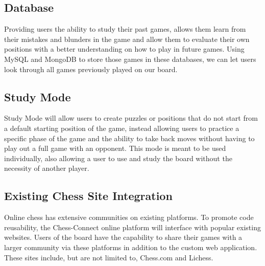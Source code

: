 \documentclass{article}
\begin{document}
\subsection{Database}
{Providing users the ability to study their past games, allows them learn from their mistakes and blunders in the game and allow them to evaluate their own positions with a better understanding on how to play in future games. 
Using MySQL and MongoDB to store those games in these databases, we can let users look through all games previously played on our board.}

\subsection{Study Mode}
{Study Mode will allow users to create puzzles or positions that do not start from a default starting position of the game, instead allowing users to practice a specific phase of the game and the ability to take back moves without having to play out a full game with an opponent. This mode is meant to be used individually, also allowing a user to use and study the board without the necessity of another player.}

\subsection{Existing Chess Site Integration}
{Online chess has extensive communities on existing platforms. To promote code reusability, the Chess-Connect online platform will interface with popular existing websites.
Users of the board have the capability to share their games with a larger community via these platforms in addition to the custom web application. These sites include, but are not limited to, Chess.com and Lichess.}
\end{document}
